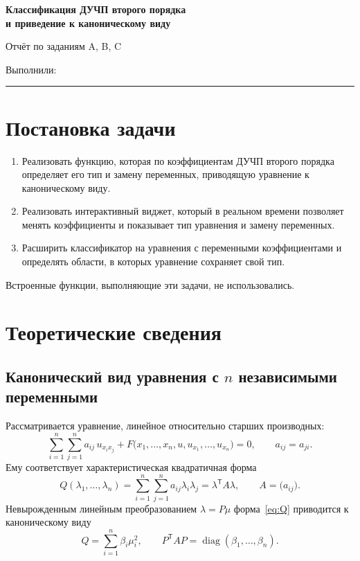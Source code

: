 \documentclass[a4paper,12pt]{article}
\DeclareMathOperator{\diag}{diag}
\begin{document}
\begin{center}
  {\Large\bfseries Классификация ДУЧП второго порядка\\[2pt]
   и приведение к каноническому виду\par}
  \vspace{6pt}
  {Отчёт по заданиям A, B, C\par}
  \vspace{4pt}
  {Выполнили: \rule{8cm}{0.4pt}\par}
\end{center}

\section*{Постановка задачи}

\begin{enumerate}[label=\textbf{\Alph*.}]
  \item Реализовать функцию, которая по коэффициентам ДУЧП второго порядка
        определяет его тип и замену переменных, приводящую уравнение
        к каноническому виду.
  \item Реализовать интерактивный виджет, который в реальном времени позволяет
        менять коэффициенты и показывает тип уравнения и замену переменных.
  \item Расширить классификатор на уравнения с переменными коэффициентами
        и определять области, в которых уравнение сохраняет свой тип.
\end{enumerate}

Встроенные функции, выполняющие эти задачи, не использовались.

\section{Теоретические сведения}

\subsection{Канонический вид уравнения с \texorpdfstring{$n$}{n} независимыми переменными}
\label{ss:n}

Рассматривается уравнение, линейное относительно старших производных:
\begin{equation}\label{eq:general}
  \sum_{i=1}^{n}\sum_{j=1}^{n} a_{ij}\,u_{x_i x_j}
  + F\bigl(x_1,\dots,x_n,u,u_{x_1},\dots,u_{x_n}\bigr) = 0,
  \qquad a_{ij}=a_{ji}.
\end{equation}
Ему соответствует характеристическая квадратичная форма
\begin{equation}\label{eq:Q}
  Q(\lambda_1,\dots,\lambda_n)=\sum_{i=1}^{n}\sum_{j=1}^{n} a_{ij}\lambda_i\lambda_j
  =\lambda^{\mathsf T}\!A\lambda,
  \qquad A=\bigl(a_{ij}\bigr).
\end{equation}
Невырожденным линейным преобразованием $\lambda=P\mu$ форма~\eqref{eq:Q}
приводится к каноническому виду
\begin{equation}\label{eq:Qcan}
  Q=\sum_{i=1}^{n}\beta_i\mu_i^{2},
  \qquad P^{\mathsf T}\!AP=\diag(\beta_1,\dots,\beta_n).
\end{equation}
\end{document}
